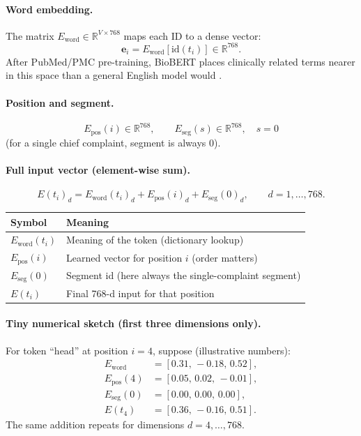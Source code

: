 \paragraph{Word embedding.}
The matrix \(E_{\mathrm{word}} \in \mathbb{R}^{V \times 768}\) maps each ID to a dense vector:
\begin{equation}
  \mathbf{e}_i = E_{\mathrm{word}}[\mathrm{id}(t_i)] \in \mathbb{R}^{768}.
\end{equation}
After PubMed/PMC pre-training, BioBERT places clinically related terms nearer in this space than a general English model would \citep{lee2020biobert}.

\paragraph{Position and segment.}
\begin{equation}
  E_{\mathrm{pos}}(i) \in \mathbb{R}^{768}, \qquad E_{\mathrm{seg}}(s) \in \mathbb{R}^{768}, \quad s=0
\end{equation}
(for a single chief complaint, segment is always \(0\)).

\paragraph{Full input vector (element-wise sum).}
\begin{equation}
  E(t_i)_d
  = E_{\mathrm{word}}(t_i)_d + E_{\mathrm{pos}}(i)_d + E_{\mathrm{seg}}(0)_d,
  \qquad d=1,\ldots,768.
  \label{eq:embed-sum}
\end{equation}

\begin{center}
\small
\begin{tabular}{@{}lp{9.5cm}@{}}
\toprule
Symbol & Meaning \\
\midrule
\(E_{\mathrm{word}}(t_i)\) & Meaning of the token (dictionary lookup) \\
\(E_{\mathrm{pos}}(i)\) & Learned vector for position \(i\) (order matters) \\
\(E_{\mathrm{seg}}(0)\) & Segment id (here always the single-complaint segment) \\
\(E(t_i)\) & Final 768-d input for that position \\
\bottomrule
\end{tabular}
\end{center}

\paragraph{Tiny numerical sketch (first three dimensions only).}
For token ``head'' at position \(i=4\), suppose (illustrative numbers):
\begin{align*}
  E_{\mathrm{word}} &= [0.31,\,-0.18,\,0.52], \\
  E_{\mathrm{pos}}(4) &= [0.05,\,0.02,\,-0.01], \\
  E_{\mathrm{seg}}(0) &= [0.00,\,0.00,\,0.00], \\
  E(t_4) &= [0.36,\,-0.16,\,0.51].
\end{align*}
The same addition repeats for dimensions \(d=4,\ldots,768\).

